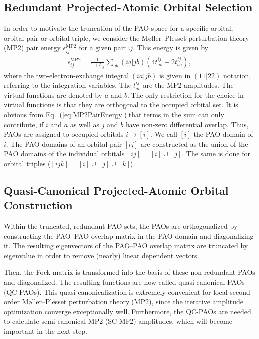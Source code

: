 \subsection{Redundant Projected-Atomic Orbital Selection}
In order to motivate the truncation of the PAO space for a specific orbital, orbital pair or orbital triple,
we consider the M{\o}ller--Plesset perturbation theory (MP2) pair energy $\epsilon_{ij}^\mathrm{MP2}$ for
a given pair $ij$. This energy is given by~\cite{Pulay1983}
\begin{align}
  \epsilon_{ij}^\mathrm{MP2} = \frac{1}{1+\delta_{ij}}\sum_{ab}{(ia|jb)}(4t^{ij}_{ab}-2t^{ij}_{ba}),
  \label{eq:MP2PairEnergy}
\end{align}
where the two-electron-exchange integral $(ia|jb)$ is given in $(11|22)$ notation, referring to the integration
variables. The $t^{ij}_{ab}$ are the MP2 amplitudes. The virtual functions are denoted by $a$ and $b$.
The only restriction for the choice in virtual functions is that they are orthogonal to the occupied orbital set.
It is obvious from Eq.~(\ref{eq:MP2PairEnergy}) that terms in the sum can only contribute, if $i$ and $a$ as well as $j$
and $b$ have non-zero differential overlap. Thus, PAOs are assigned to occupied orbitals $i\rightarrow [i]$.
We call $[i]$ the PAO domain of $i$. The PAO domains of an orbital pair $[ij]$ are constructed
as the union of the PAO domains of the individual orbitals $[ij]=[i]\cup [j]$. The same is done for orbital
triples ($[ijk]=[i]\cup [j]\cup [k]$).

\subsection{Quasi-Canonical Projected-Atomic Orbital Construction}
Within the truncated, redundant PAO sets, the PAOs are orthogonalized by constructing the PAO--PAO overlap matrix
in the PAO domain and diagonalizing it. The resulting eigenvectors of the PAO--PAO overlap matrix are
truncated by eigenvalue in order to remove (nearly) linear dependent vectors.

Then, the Fock matrix is transformed into the basis of these non-redundant PAOs and diagonalized. The resulting functions
are now called quasi-canonical PAOs (QC-PAOs). This quasi-canonicalization is extremely convenient for local
second order M{\o}ller--Plesset perturbation theory (MP2), since the iterative amplitude optimization
converge exceptionally well. Furthermore, the QC-PAOs are needed to calculate semi-canonical MP2 (SC-MP2)
amplitudes, which will become important in the next step.


